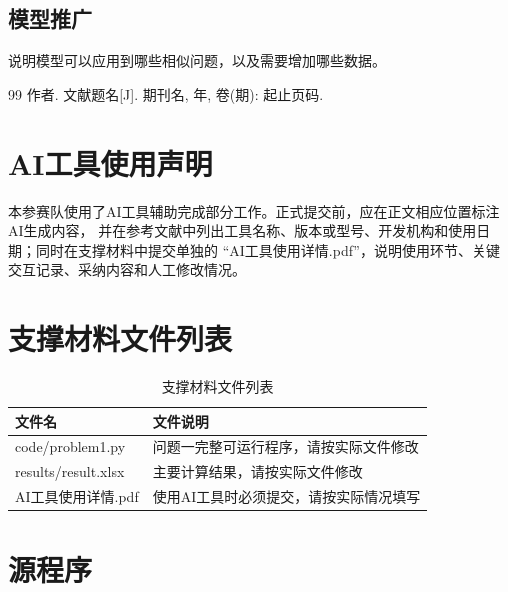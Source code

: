 \documentclass[UTF8,a4paper,12pt,fontset=fandol]{ctexart}
\begin{document}
\subsection{模型推广}
说明模型可以应用到哪些相似问题，以及需要增加哪些数据。

\begin{thebibliography}{99}
   作者. 文献题名[J]. 期刊名, 年, 卷(期): 起止页码.
\end{thebibliography}

\section*{AI工具使用声明}
本参赛队使用了AI工具辅助完成部分工作。正式提交前，应在正文相应位置标注AI生成内容，
并在参考文献中列出工具名称、版本或型号、开发机构和使用日期；同时在支撑材料中提交单独的
“AI工具使用详情.pdf”，说明使用环节、关键交互记录、采纳内容和人工修改情况。

\newpage
\begin{appendices}

\section{支撑材料文件列表}
\begin{table}[H]
  \centering
  \caption{支撑材料文件列表}
  \begin{tabularx}{\textwidth}{lX}
    \toprule
    文件名 & 文件说明 \\
    \midrule
    code/problem1.py & 问题一完整可运行程序，请按实际文件修改 \\
    results/result.xlsx & 主要计算结果，请按实际文件修改 \\
    AI工具使用详情.pdf & 使用AI工具时必须提交，请按实际情况填写 \\
    \bottomrule
  \end{tabularx}
\end{table}

\section{源程序}
% 

\end{appendices}
\end{document}
